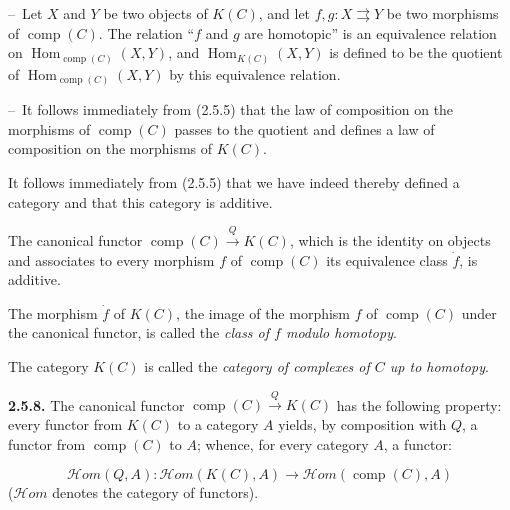 %
\noindent\hspace*{2em}--\ Let $X$ and $Y$ be two objects of $K(C)$, and let
$f,g\colon X\rightrightarrows Y$ be two morphisms of
$\operatorname{comp}(C)$. The relation ``$f$ and $g$ are homotopic'' is an
equivalence relation on $\operatorname{Hom}_{\operatorname{comp}(C)}(X,Y)$,
and $\operatorname{Hom}_{K(C)}(X,Y)$ is defined to be the quotient of
$\operatorname{Hom}_{\operatorname{comp}(C)}(X,Y)$ by this equivalence
relation.

\noindent\hspace*{2em}--\ It follows immediately from (2.5.5) that the law of
composition on the morphisms of $\operatorname{comp}(C)$ passes to the
quotient and defines a law of composition on the morphisms of $K(C)$.

It follows immediately from (2.5.5) that we have indeed thereby defined a
category and that this category is additive.

The canonical functor $\operatorname{comp}(C)\xrightarrow{Q}K(C)$, which is
the identity on objects and associates to every morphism $f$ of
$\operatorname{comp}(C)$ its equivalence class $\dot f$, is additive.

The morphism $\dot f$ of $K(C)$, the image of the morphism $f$ of
$\operatorname{comp}(C)$ under the canonical functor, is called the
\emph{class of $f$ modulo homotopy}.

The category $K(C)$ is called the \emph{category of complexes of $C$ up to
homotopy}.

\noindent\textbf{2.5.8.}\quad
The canonical functor $\operatorname{comp}(C)\xrightarrow{Q}K(C)$ has the
following property: every functor from $K(C)$ to a category $A$ yields, by
composition with $Q$, a functor from $\operatorname{comp}(C)$ to $A$; whence,
for every category $A$, a functor:

\begin{equation*}
  \mathcal H\!om(Q,A)\colon
  \mathcal H\!om(K(C),A)
  \longrightarrow
  \mathcal H\!om(\operatorname{comp}(C),A)
\end{equation*}
($\mathcal H\!om$ denotes the category of functors).

